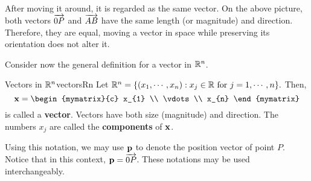 \begin{center}
\end{center}

After moving it around, it is regarded as the same vector. On the above picture, both vectors $\overrightarrow{0P}$ and $\overrightarrow{AB}$ have the same length (or magnitude) and direction. Therefore, they are equal, moving a vector in space while preserving its orientation does not alter it.

Consider now the general definition for a vector in $\mathbb{R}^n$. 

\begin{definition}{Vectors in $\mathbb{R}^n$}{vectorsRn}
Let $\mathbb{R}^{n} = \{\left( x_{1}, \cdots, x_{n}\right)
:x_{j}\in \mathbb{R}\mbox{ for }j=1,\cdots ,n\} .$
Then,
\begin{equation*}
\vect{x}
=
\begin{mymatrix}{c}
x_{1} \\
\vdots \\
x_{n}
\end{mymatrix} 
\end{equation*}
is called a \textbf{vector}. Vectors have both size (magnitude) and direction. 
The numbers $x_{j}$ are called the \textbf{components} of ${\bf x}$. 

\end{definition}

Using this notation, we may use ${\bf p}$ to denote the position vector of point $P$. Notice that in this context, ${\bf p} = \overrightarrow{0P}$. These notations may be used interchangeably. 

